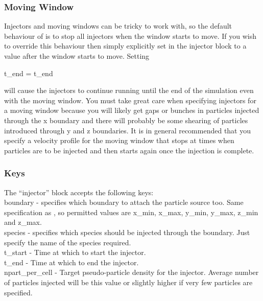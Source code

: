 \subsubsection{Moving Window}

Injectors and moving windows can be tricky to work with, so the default
behaviour of {\EPOCH} is to stop all injectors when the window starts to move.
If you wish to override this behaviour then simply explicitly set
 in the injector block to a value after the window starts
to move. Setting
\begin{boxverbatim}
t_end = t_end
\end{boxverbatim}
will cause the injectors to continue running until the end of the simulation
even with the moving window. You must take great care when specifying injectors
for a moving window because you will likely get gaps or bunches in particles
injected through the x boundary and there will probably be some shearing of
particles introduced through y and z boundaries. It is in general recommended
that you specify a velocity profile for the moving window that stops at times
when particles are to be injected and then starts again once the injection is
complete.

\subsubsection{Keys}

The ``injector'' block accepts the following keys:\\

{\emphtext boundary} - specifies which boundary to attach the particle source
  too. Same specification as , so permitted values are
  x\_min, x\_max, y\_min, y\_max, z\_min and z\_max.\\

{\emphtext species} - specifies which species should be injected through the
  boundary. Just specify the name of the species required.\\

{\emphtext t\_start} - Time at which to start the injector.\\

{\emphtext t\_end} - Time at which to end the injector.\\

{\emphtext npart\_per\_cell} - Target pseudo-particle density for the
  injector. Average number of particles injected will be this value or slightly
  higher if very few particles are specified.\\

